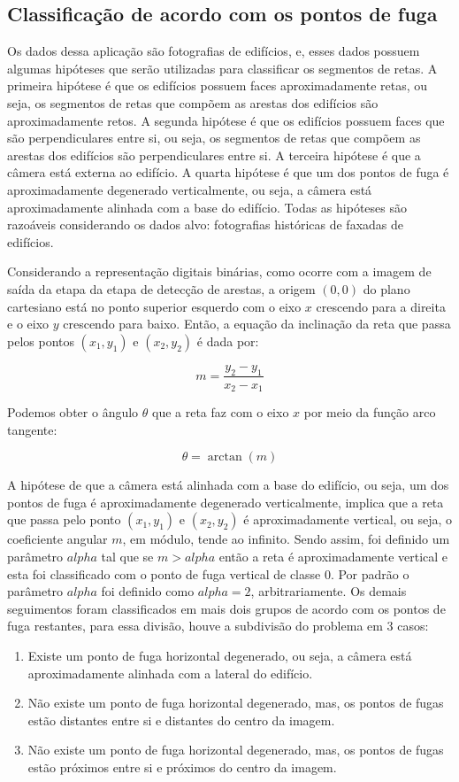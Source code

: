 \documentclass[12pt]{article}
\begin{document}
\subsection{Classificação de acordo com os pontos de fuga}


Os dados dessa aplicação são fotografias de edifícios, e, esses dados possuem algumas hipóteses que serão utilizadas para classificar os segmentos de retas. A primeira hipótese é que os edifícios possuem faces aproximadamente retas, ou seja, os segmentos de retas que compõem as arestas dos edifícios são aproximadamente retos. A segunda hipótese é que os edifícios possuem faces que são perpendiculares entre si, ou seja, os segmentos de retas que compõem as arestas dos edifícios são perpendiculares entre si. A terceira hipótese é que a câmera está externa ao edifício. A quarta hipótese é que um dos pontos de fuga é aproximadamente degenerado verticalmente, ou seja, a câmera está aproximadamente alinhada com a base do edifício. Todas as hipóteses são razoáveis considerando os dados alvo: fotografias históricas de faxadas de edifícios.

Considerando a representação digitais binárias, como ocorre com a imagem de saída da etapa da etapa de detecção de arestas, a origem $(0,0)$ do plano cartesiano está no ponto superior esquerdo com o eixo $x$ crescendo para a direita e o eixo $y$ crescendo para baixo. Então, a equação da inclinação da reta que passa pelos pontos $(x_1,y_1)$ e $(x_2,y_2)$ é dada por:

$$ 
m = \frac{y_2-y_1}{x_2-x_1}
$$

Podemos obter o ângulo $\theta$ que a reta faz com o eixo $x$ por meio da função arco tangente:

$$
\theta = \arctan(m)
$$

A hipótese de que a câmera está alinhada com a base do edifício, ou seja, um dos pontos de fuga é aproximadamente degenerado verticalmente, implica que a reta que passa pelo ponto $(x_1,y_1)$ e $(x_2,y_2)$ é aproximadamente vertical, ou seja, o coeficiente angular $m$, em módulo, tende ao infinito. Sendo assim, foi definido um parâmetro $alpha$ tal que se $m > alpha$ então a reta é aproximadamente vertical e esta foi classificado com o ponto de fuga vertical de classe 0. Por padrão o parâmetro $alpha$ foi definido como $alpha=2$, arbitrariamente. Os demais seguimentos foram classificados em mais dois grupos de acordo com os pontos de fuga restantes, para essa divisão, houve a subdivisão do problema em 3 casos:

\begin{enumerate}
    \item Existe um ponto de fuga horizontal degenerado, ou seja, a câmera está aproximadamente alinhada com a lateral do edifício.
    \item Não existe um ponto de fuga horizontal degenerado, mas, os pontos de fugas estão distantes entre si e distantes do centro da imagem.
    \item Não existe um ponto de fuga horizontal degenerado, mas, os pontos de fugas estão próximos entre si e próximos do centro da imagem.
\end{enumerate}
\end{document}

